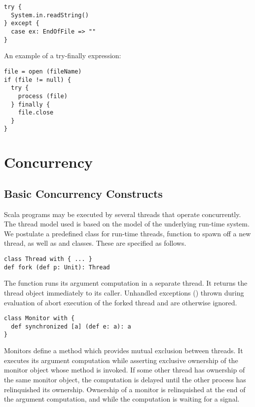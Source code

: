 \documentclass[11pt]{report}
\begin{document}
\begin{itemize}
\begin{verbatim}
try {
  System.in.readString()
} except {
  case ex: EndOfFile => ""
}
\end{verbatim}

\example An example of a try-finally expression:

\begin{verbatim}
file = open (fileName)
if (file != null) {
  try {
    process (file)
  } finally {
    file.close
  }
}
\end{verbatim}

\section{Concurrency}
\label{sec:concurrency}

\subsection{Basic Concurrency Constructs}

Scala programs may be executed by several threads that operate
concurrently.  The thread model used is based on the model of the
underlying run-time system. We postulate a predefined
class \verb@Thread@ for run-time threads,
\verb@fork@ function to spawn off a new thread,
as well as \verb@Monitor@ and \verb@Signal@ classes. These are
specified as follows.


\begin{verbatim}
class Thread with { ... }
def fork (def p: Unit): Thread
\end{verbatim}

The \verb@fork@ function runs its argument computation \verb@p@ in a
separate thread.  It returns the thread object immediately to its
caller.  Unhandled exceptions () thrown during
evaluation of \verb@p@ abort execution of the forked thread and are
otherwise ignored.

\begin{verbatim}
class Monitor with {
  def synchronized [a] (def e: a): a
}
\end{verbatim}

Monitors define a \verb@synchronized@ method which provides mutual
exclusion between threads.  It executes its argument computation
\verb@e@ while asserting exclusive ownership of the monitor
object whose method is invoked. If some other thread has ownership of
the same monitor object, the computation is delayed until the other
process has relinquished its ownership. Ownership of a monitor is
relinquished at the end of the argument computation, and while the
computation is waiting for a signal.


\end{itemize}
\end{document}
